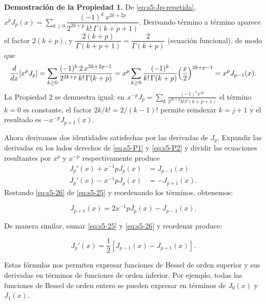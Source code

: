\begin{remark}
\textbf{Demostración de la Propiedad 1.} De \eqref{eq:s5-Jp-repetida}, $x^pJ_p(x)=\sum_{k\ge0}\dfrac{(-1)^k\,x^{2k+2p}}{2^{2k+p}\,k!\,\Gamma(k+p+1)}$. Derivando término a término aparece el factor $2(k+p)$, y $\dfrac{2(k+p)}{\Gamma(k+p+1)}=\dfrac{2}{\Gamma(k+p)}$ (ecuación funcional), de modo que
\[ \frac{d}{dx}[x^pJ_p]=\sum_{k\ge0}\frac{(-1)^k\,2\,x^{2k+2p-1}}{2^{2k+p}\,k!\,\Gamma(k+p)}=x^p\sum_{k\ge0}\frac{(-1)^k}{k!\,\Gamma(k+p)}\Bigl(\frac x2\Bigr)^{2k+p-1}=x^pJ_{p-1}(x). \]
La Propiedad 2 se demuestra igual: en $x^{-p}J_p=\sum_k\frac{(-1)^kx^{2k}}{2^{2k+p}k!\Gamma(k+p+1)}$ el término $k=0$ es constante, el factor $2k/k!=2/(k-1)!$ permite reindexar $k=j+1$ y el resultado es $-x^{-p}J_{p+1}(x)$.
\end{remark}
 
Ahora derivamos dos identidades satisfechas por las derivadas de $J_p$. Expandir las derivadas en los lados derechos de \eqref{eq:s5-P1} y \eqref{eq:s5-P2} y dividir las ecuaciones resultantes por $x^p$ y $x^{-p}$ respectivamente produce
\begin{align}
J_p'(x) + x^{-1}p J_p(x) &= J_{p-1}(x) \label{eq:s5-25}\\
J_p'(x) - x^{-1}p J_p(x) &= -J_{p+1}(x). \label{eq:s5-26}
\end{align}
Restando \eqref{eq:s5-26} de \eqref{eq:s5-25} y reordenando los términos, obtenemos:
 
\begin{theorem}\label{thm:s5-P3}
\begin{equation}
J_{p+1}(x) = 2x^{-1}p J_p(x) - J_{p-1}(x).
\label{eq:s5-P3}
\end{equation}
\end{theorem}
 
De manera similar, sumar \eqref{eq:s5-25} y \eqref{eq:s5-26} y reordenar produce:
 
\begin{theorem}[Propiedad 4]\label{thm:s5-P4}
\begin{equation}
J_p'(x) = \frac{1}{2} [J_{p-1}(x) - J_{p+1}(x)].
\label{eq:s5-P4}
\end{equation}
\end{theorem}
 
Estas fórmulas nos permiten expresar funciones de Bessel de orden superior y sus derivadas en términos de funciones de orden inferior. Por ejemplo, todas las funciones de Bessel de orden entero se pueden expresar en términos de $J_0(x)$ y $J_1(x)$.
 
